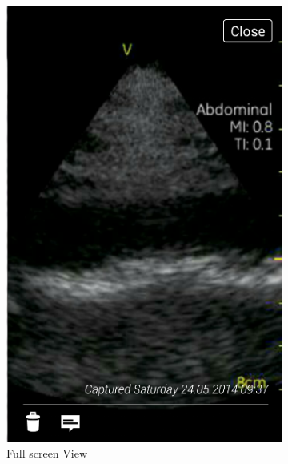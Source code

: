 \begin{figure}[H]
\centering
    \begin{subfigure}[b]{0.49\textwidth}
        \includegraphics[width=\textwidth]{img/interface/6-ViewImage.png}
        \caption*{Full screen View}
        \label{fig:06viewimage}
    \end{subfigure}
    \begin{subfigure}[b]{0.49\textwidth}

\end{subfigure}
\end{figure}
